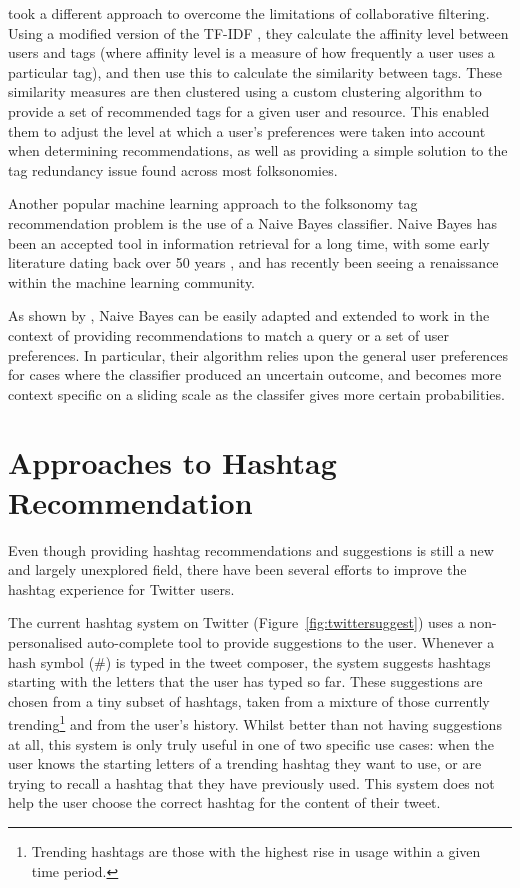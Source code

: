 \documentclass[11pt,a4paper]{report}
\begin{document}
\textcite{Niwa:2006} took a different approach to overcome the limitations of collaborative filtering. Using a modified version of the TF-IDF \parencite{Salton:1988}, they calculate the affinity level between users and tags (where affinity level is a measure of how frequently a user uses a particular tag), and then use this to calculate the similarity between tags. These similarity measures are then clustered using a custom clustering algorithm to provide a set of recommended tags for a given user and resource. This enabled them to adjust the level at which a user's preferences were taken into account when determining recommendations, as well as providing a simple solution to the tag redundancy issue found across most folksonomies.

Another popular machine learning approach to the folksonomy tag recommendation problem is the use of a Naive Bayes classifier. Naive Bayes has been an accepted tool in information retrieval for a long time, with some early literature dating back over 50 years \parencite{Maron:1960}, and has recently been seeing a renaissance within the machine learning community.

As shown by \textcite{DePessemier:2010}, Naive Bayes can be easily adapted and extended to work in the context of providing recommendations to match a query or a set of user preferences. In particular, their algorithm relies upon the general user preferences for cases where the classifier produced an uncertain outcome, and becomes more context specific on a sliding scale as the classifer gives more certain probabilities.

\section{Approaches to Hashtag Recommendation}
Even though providing hashtag recommendations and suggestions is still a new and largely unexplored field, there have been several efforts to improve the hashtag experience for Twitter users.

The current hashtag system on Twitter (Figure~\ref{fig:twittersuggest}) uses a non-personalised auto-complete tool to provide suggestions to the user. Whenever a hash symbol (\#) is typed in the tweet composer, the system suggests hashtags starting with the letters that the user has typed so far. These suggestions are chosen from a tiny subset of hashtags, taken from a mixture of those currently trending\footnote{Trending hashtags are those with the highest rise in usage within a given time period.} and from the user's history. Whilst better than not having suggestions at all, this system is only truly useful in one of two specific use cases: when the user knows the starting letters of a trending hashtag they want to use, or are trying to recall a hashtag that they have previously used. This system does not help the user choose the correct hashtag for the content of their tweet.
\end{document}
